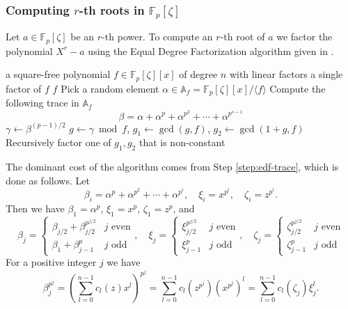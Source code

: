 \documentclass[12pt]{article}
\theoremstyle{plain}
\theoremstyle{definition}
\def\F{\ensuremath{\mathbb{F}}}
\newcounter{algorithm}
\begin{document}

\subsubsection{Computing $r$-th roots in $\F_p[\zeta]$}
\label{subsection:rth-root-fpz}

Let $a \in \F_p[\zeta]$ be an $r$-th power. To compute an $r$-th root of $a$ we factor the 
polynomial $X^r - a$ using the Equal Degree Factorization algorithm given in 
\cite{kaltofen+shoup97}.
\begin{algorithm}
	\label{algorithm:edf}
	\begin{algorithmic}[1]
		\REQUIRE a square-free polynomial $f \in \F_p[\zeta][x]$ of degree $n$ with linear factors
		\ENSURE a single factor of $f$
		\RETURN $f$
		\ENDIF
		\STATE Pick a random element $\alpha \in \mathbb{A}_f = \F_p[\zeta][x]/\langle f \rangle$
		\STATE\label{step:edf-trace} Compute the following trace in $\mathbb{A}_f$
		\[ \beta = \alpha + \alpha^p + \alpha^{p^2} + \cdots + \alpha^{p^{s - 1}} \]
		\STATE $\gamma \leftarrow \beta^{(p - 1) / 2}$
		\STATE $g \leftarrow \gamma \bmod f$, $g_1 \leftarrow \gcd(g, f)$, $g_2 \leftarrow \gcd(1 + 
		g, f)$
		\STATE Recursively factor one of $g_1, g_2$ that is non-constant
	\end{algorithmic}
\end{algorithm}
The dominant cost of the algorithm comes from Step \ref{step:edf-trace}, which is done as follows. 
Let
\[ \beta_i = \alpha^p + \alpha^{p^2} + \cdots + \alpha^{p^i}, \quad \xi_i = x^{p^i}, \quad \zeta_i 
= z^{p^i}. \]
Then we have $\beta_1 = \alpha^p$, $\xi_1 = x^p$, $\zeta_1 = z^p$, and
\[
\beta_j = 
\begin{cases}
	\beta_{j / 2} + \beta_{j / 2}^{p^{j / 2}} & j \text{ even} \\
	\beta_1 + \beta_{j - 1}^p & j \text{ odd}
\end{cases}, \quad
\xi_j = 
\begin{cases}
	\xi_{j / 2}^{p^{j / 2}} & j \text{ even} \\
	\xi_{j - 1}^p & j \text{ odd}
\end{cases}, \quad
\zeta_j = 
\begin{cases}
	\zeta_{j / 2}^{p^{j / 2}} & j \text{ even} \\
	\zeta_{j - 1}^p & j \text{ odd}
\end{cases}
\]
For a positive integer $j$ we have
\begin{equation}
	\label{equation:betaj}
	\beta_j^{p^j} = \left( \sum_{l = 0}^{n - 1}c_l(z)x^l \right)^{p^j} = \sum_{l = 0}^{n - 
	1}c_l(z^{p^j})(x^{p^j})^l = \sum_{l = 0}^{n - 1}c_l(\zeta_j)\xi_j^l.
\end{equation}
\end{document}
